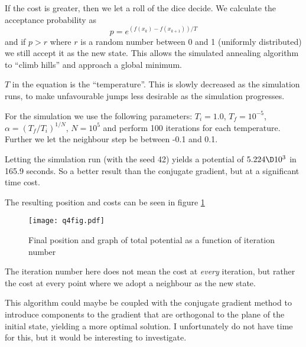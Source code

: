 \documentclass[a4paper,10pt]{article}
\begin{document}
	If the cost is greater, then we let a roll of the dice decide. We calculate the acceptance probability as
	\begin{equation}\label{key}
		p = e^{(f(x_k) - f(x_{k+1}))/T}
	\end{equation}
	and if $ p>r $ where $ r $ is a random number between 0 and 1 (uniformly distributed) we still accept it as the new state. This allows the simulated annealing algorithm to ``climb hills'' and approach a global minimum.
	
	$ T $ in the equation is the ``temperature''. This is slowly decreased as the simulation runs, to make unfavourable jumps less desirable as the simulation progresses.
	
	For the simulation we use the following parameters: $ T_i = 1.0 $, $ T_f = 10^{-5} $, $\alpha = (T_f/T_i)^{1/N} $, $ N=10^5 $ and perform 100 iterations for each temperature. Further we let the neighbour step be between -0.1 and 0.1.
	
	Letting the simulation run (with the seed 42) yields a potential of $ 5.224 \D 10^{3} $ in 165.9 seconds. So a better result than the conjugate gradient, but at a significant time cost.
	
	The resulting position and costs can be seen in figure \ref{fig:q4fig}
	\begin{figure}[H]
		\centering
		\texttt{[image: q4fig.pdf]}
		\caption{Final position and graph of total potential as a function of iteration number}
		\label{fig:q4fig}
	\end{figure}
	The iteration number here does not mean the cost at \textit{every} iteration, but rather the cost at every point where we adopt a neighbour as the new state.
	
	This algorithm could maybe be coupled with the conjugate gradient method to introduce components to the gradient that are orthogonal to the plane of the initial state, yielding a more optimal solution. I unfortunately do not have time for this, but it would be interesting to investigate.
	
	
\end{document}
